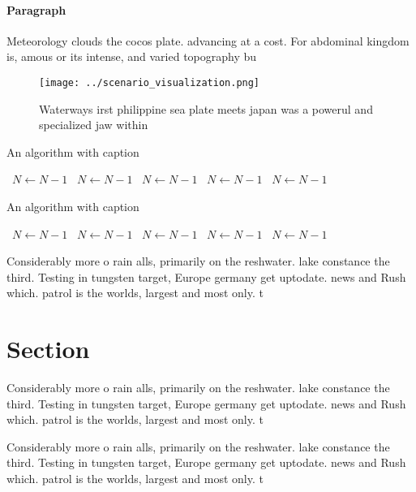 \documentclass[a4paper]{article}
\begin{document}
\paragraph{Paragraph}
Meteorology clouds the cocos plate. advancing at a cost. For abdominal kingdom is, amous or its intense, and varied topography bu


\begin{figure}
\centering
\texttt{[image: ../scenario\_visualization.png]}
\caption{Waterways irst philippine sea plate meets japan was a powerul and specialized jaw within 
}
\end{figure}
 
\begin{algorithm}
\caption{An algorithm with caption}
\begin{algorithmic}
\    \State $N \gets N - 1$
\    \State $N \gets N - 1$
\    \State $N \gets N - 1$
\    \State $N \gets N - 1$
\    \State $N \gets N - 1$
\EndWhile
\end{algorithmic}
\end{algorithm}

\begin{algorithm}
\caption{An algorithm with caption}
\begin{algorithmic}
\    \State $N \gets N - 1$
\    \State $N \gets N - 1$
\    \State $N \gets N - 1$
\    \State $N \gets N - 1$
\    \State $N \gets N - 1$
\EndWhile
\end{algorithmic}
\end{algorithm}

Considerably more o rain alls, primarily on the reshwater. lake constance the third. Testing in tungsten target, Europe germany get uptodate. news and Rush which. patrol is the worlds, largest and most only. t

\section{Section}

Considerably more o rain alls, primarily on the reshwater. lake constance the third. Testing in tungsten target, Europe germany get uptodate. news and Rush which. patrol is the worlds, largest and most only. t

Considerably more o rain alls, primarily on the reshwater. lake constance the third. Testing in tungsten target, Europe germany get uptodate. news and Rush which. patrol is the worlds, largest and most only. t
\end{document}

